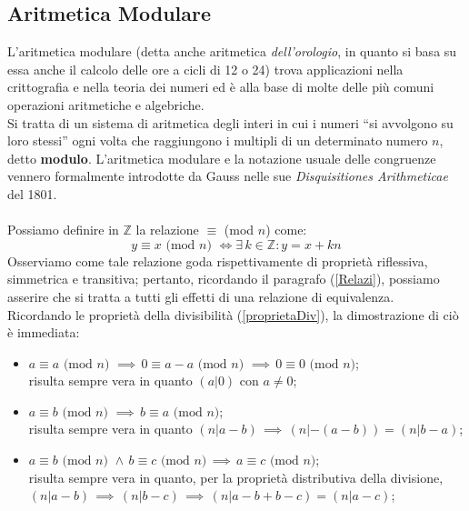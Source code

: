 \documentclass[a4paper,12pt]{article}
\begin{document}
\subsection{Aritmetica Modulare}
L'aritmetica modulare (detta anche aritmetica \emph{dell'orologio}, in quanto si basa su essa anche il calcolo delle ore a cicli di 12 o 24) trova applicazioni nella crittografia e nella teoria dei numeri ed è alla base di molte delle più comuni operazioni aritmetiche e algebriche.\\
Si tratta di un sistema di aritmetica degli interi in cui i numeri ``si avvolgono su loro stessi'' ogni volta che raggiungono i multipli di un determinato numero $n$, detto \textbf{modulo}. L'aritmetica modulare e la notazione usuale delle congruenze vennero formalmente introdotte da Gauss nelle sue \emph{Disquisitiones Arithmeticae} del 1801.\\\\
Possiamo definire in $\mathbb{Z}$ la relazione $\equiv$ (mod $n$) come:
\begin{equation} \label{definizioneModulo}
    y \equiv x  \text{ (mod $n$) } \Longleftrightarrow \exists \, k \in \mathbb{Z} : y = x + k n
\end{equation}
Osserviamo come tale relazione goda rispettivamente di proprietà riflessiva, simmetrica e transitiva; pertanto, ricordando il paragrafo (\ref{Relazi}), possiamo asserire che si tratta a tutti gli effetti di una relazione di equivalenza.\\
Ricordando le proprietà della divisibilità (\ref{proprietaDiv}), la dimostrazione di ciò è immediata:
\begin{itemize}
    \item $a \equiv a \text{ (mod $n$) } \implies \, 0 \equiv a - a \text{ (mod $n$) } \implies \, 0 \equiv 0 \text{ (mod $n$)}$;\\
    risulta sempre vera in quanto $(a|0)$ con $a \neq 0$;
    \item $a \equiv b \text{ (mod $n$) } \implies \, b \equiv a \text{ (mod $n$)} $;\\
    risulta sempre vera in quanto $(n|a-b)\, \implies \, (n|-(a-b)) = (n|b-a)$;
    \item $a \equiv b \text{ (mod $n$) } \land \, b \equiv c \text{ (mod $n$)}\, \implies \, a \equiv c \text{ (mod $n$)}$;\\
    risulta sempre vera in quanto, per la proprietà distributiva della divisione,  $(n|a-b)\, \implies \, (n|b-c) \, \implies \, (n|a-b+b-c) = (n|a-c)$;
\end{itemize}
\end{document}
